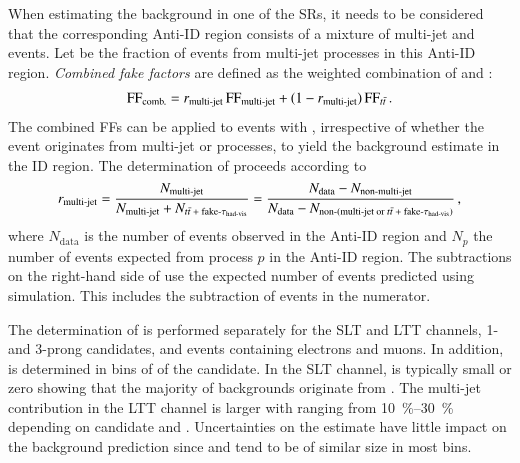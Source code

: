 When estimating the \faketauhadvis background in one of the \lephad SRs, it
needs to be considered that the corresponding Anti-ID region consists of a
mixture of multi-jet and \ttbarFakes events. Let \rqcd be the fraction of
\faketauhadvis events from multi-jet processes in this Anti-ID
region. \emph{Combined fake factors} are defined as the weighted combination of
\FFqcd and \FFttbar:
\begin{align*}
  \text{FF}_{\text{comb.}} = r_{\text{multi-jet}} \, \text{FF}_{\text{multi-jet}} + (1 - r_{\text{multi-jet}}) \, \text{FF}_{t\bar{t}} \,\text{.}
\end{align*}
The combined FFs can be applied to events with \faketauhadvis, irrespective of
whether the event originates from multi-jet or \ttbar processes, to yield the
background estimate in the ID region. The determination of \rqcd proceeds
according to
\begin{align}
  \rqcd =
  \frac{N_{\text{multi-jet}}}{N_{\text{multi-jet}} + N_{\text{\ttbarFakes}}}
  = \frac
  { N_{\text{data}} - N_{\text{non-multi-jet}} }
  { N_{\text{data}} - N_{\text{non-(multi-jet or \ttbarFakes)}} } \,\text{,}
  \label{eq:rqcd}
\end{align}
where $N_{\text{data}}$ is the number of events observed in the Anti-ID region
and $N_{p}$ the number of events expected from process $p$ in the Anti-ID
region. The subtractions on the right-hand side of  use the
expected number of events predicted using simulation. This includes the
subtraction of \ttbarFakes events in the numerator.

The determination of \rqcd is performed separately for the \lephad SLT and LTT
channels, 1- and 3-prong \tauhadvis candidates, and events containing electrons
and muons. In addition, \rqcd is determined in bins of \pT of the \tauhadvis
candidate. In the SLT channel, \rqcd is typically small or zero showing that the
majority of \faketauhadvis backgrounds originate from \ttbar. The multi-jet
contribution in the LTT channel is larger with \rqcd ranging from
\SIrange{10}{30}{\percent} depending on \tauhadvis candidate \pT and
\Ntracks. Uncertainties on the \rqcd estimate have little impact on the
\faketauhadvis background prediction since \FFqcd and \FFttbar tend to be of
similar size in most bins.

